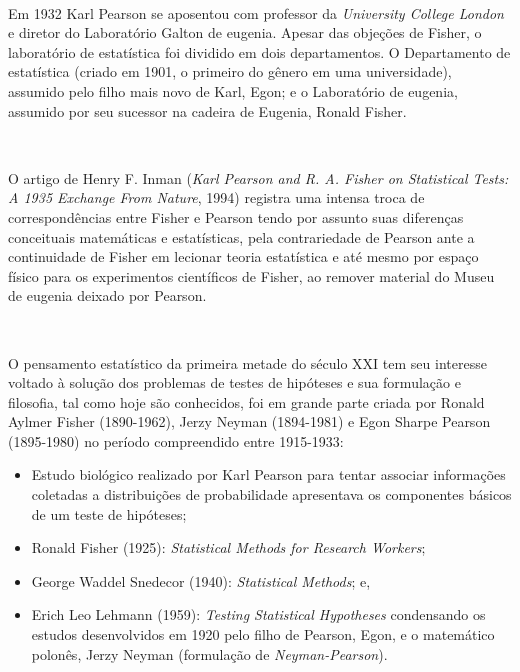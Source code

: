 \documentclass[
]{book}
\providecommand{\tightlist}{%
  \setlength{\itemsep}{0pt}\setlength{\parskip}{0pt}}
\begin{document}
~

Em 1932 Karl Pearson se aposentou com professor da \emph{University College London} e diretor do Laboratório Galton de eugenia. Apesar das objeções de Fisher, o laboratório de estatística foi dividido em dois departamentos. O Departamento de estatística (criado em 1901, o primeiro do gênero em uma universidade), assumido pelo filho mais novo de Karl, Egon; e o Laboratório de eugenia, assumido por seu sucessor na cadeira de Eugenia, Ronald Fisher.

~

O artigo de Henry F. Inman (\emph{Karl Pearson and R. A. Fisher on Statistical Tests: A 1935 Exchange From Nature}, 1994) registra uma intensa troca de correspondências entre Fisher e Pearson tendo por assunto suas diferenças conceituais matemáticas e estatísticas, pela contrariedade de Pearson ante a continuidade de Fisher em lecionar teoria estatística e até mesmo por espaço físico para os experimentos científicos de Fisher, ao remover material do Museu de eugenia deixado por Pearson.

~

O pensamento estatístico da primeira metade do século XXI tem seu interesse voltado à solução dos problemas de testes de hipóteses e sua formulação e filosofia, tal como hoje são conhecidos, foi em grande parte criada por Ronald Aylmer Fisher (1890-1962), Jerzy Neyman (1894-1981) e Egon Sharpe Pearson (1895-1980) no período compreendido entre 1915-1933:

\hfill\break

\begin{itemize}
\tightlist
\item
  Estudo biológico realizado por Karl Pearson para tentar associar informações coletadas a distribuições de probabilidade apresentava os componentes básicos de um teste de hipóteses;\\
\item
  Ronald Fisher (1925): \emph{Statistical Methods for Research Workers};
\item
  George Waddel Snedecor (1940): \emph{Statistical Methods}; e,\\
\item
  Erich Leo Lehmann (1959): \emph{Testing Statistical Hypotheses} condensando os estudos desenvolvidos em 1920 pelo filho de Pearson, Egon, e o matemático polonês, Jerzy Neyman (formulação de \emph{Neyman-Pearson}).
\end{itemize}

~
\end{document}
